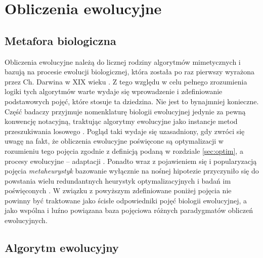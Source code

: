 \newpage
\section{Obliczenia ewolucyjne}
\label{sec:ewol}
\subsection{Metafora biologiczna}

    Obliczenia ewolucyjne należą do licznej rodziny algorytmów mimetycznych i bazują na
    procesie ewolucji biologicznej, która została po raz pierwszy wyrażona przez Ch. Darwina w XIX wieku \source. Z tego względu w celu pełnego zrozumienia logiki tych algorytmów warte wydaje się wprowadzenie i zdefiniowanie podstawowych pojęć, które stosuje ta dziedzina. 
    Nie jest to bynajmniej konieczne. Część badaczy przyjmuje nomenklaturę biologii ewolucyjnej jedynie za pewną konwencję notacyjną, traktując algorytmy ewolucyjne jako instancje metod przeszukiwania losowego \source. Pogląd taki wydaje się uzasadniony, gdy zwróci się uwagę na fakt, że obliczenia ewolucyjne poświęcone są optymalizacji w rozumieniu tego pojęcia zgodnie z definicją podaną w rozdziale \ref{sec:optim}, a procesy ewolucyjne -- adaptacji \source.
    Ponadto wraz z pojawieniem się i popularyzacją pojęcia \textit{metaheurystyk} bazowanie wyłącznie na nośnej hipotezie przyczyniło się do powstania wielu redundantnych heurystyk optymalizacyjnych i badań im poświęconych \source.
    W związku z powyższym zdefiniowane poniżej pojęcia nie powinny być traktowane jako ścisłe odpowiedniki pojęć biologii ewolucyjnej, a jako wspólna i luźno powiązana baza pojęciowa różnych paradygmatów obliczeń ewolucyjnych.
    
\subsection{Algorytm ewolucyjny}

